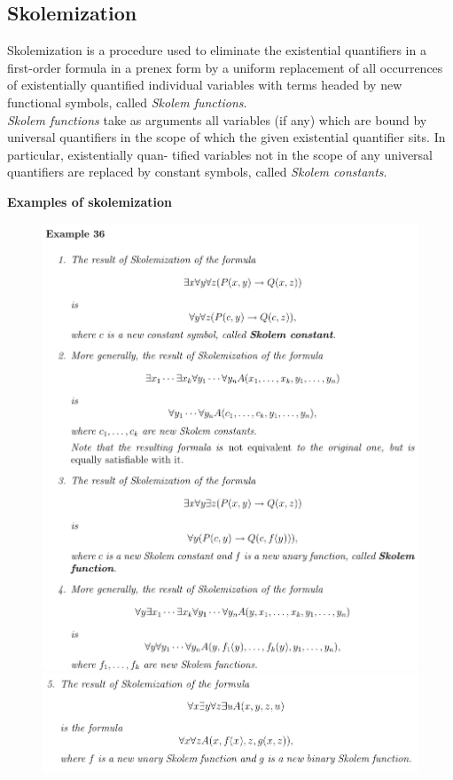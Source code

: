 \subsection{Skolemization}

Skolemization\cite[p. 60]{LecPartII} is a procedure used to eliminate the existential quantifiers in a first-order formula in a prenex form by a uniform replacement of all occurrences of existentially
quantified individual variables with terms headed by new functional symbols, called
\textit{Skolem functions}.\\

\textit{Skolem functions} take as arguments all variables (if any) which are bound by universal quantifiers in the scope of which the given existential quantifier sits. In particular, existentially quan-
tified variables not in the scope of any universal quantifiers are replaced by constant symbols, called \textit{Skolem constants}.

\textbf{Examples of skolemization}
\begin{figure}[H]
\includegraphics[scale=0.6]{./figures/skolemex1.pdf}
\includegraphics[scale=0.6]{./figures/skolemex2.pdf}
\end{figure}


